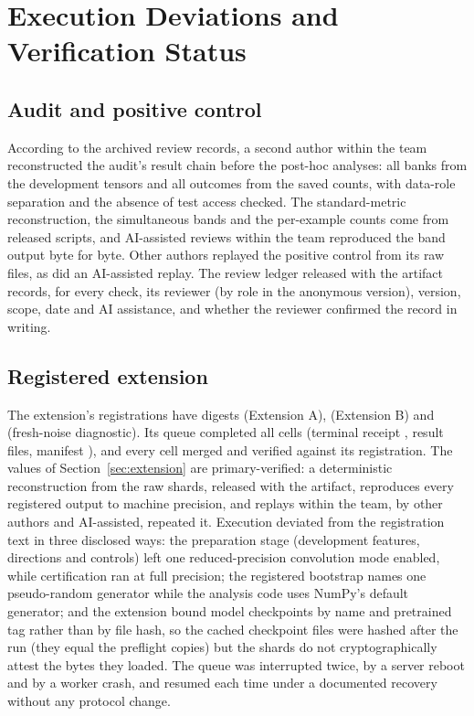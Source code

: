 
\section{Execution Deviations and Verification Status}
\label{app:deviations}

\subsection{Audit and positive control}

According to the archived review records, a second author within the team
reconstructed the audit's result chain before the post-hoc analyses: all
\ExpBanks{} banks from the development tensors and all \ExpRows{} outcomes from
the saved counts, with data-role separation and the absence of test access
checked. The standard-metric reconstruction, the simultaneous bands and the
per-example counts come from released scripts, and AI-assisted reviews within
the team reproduced the band output byte for byte. Other authors replayed the
positive control from its raw files, as did an AI-assisted replay. The review
ledger released with the artifact records, for every
check, its reviewer (by role in the anonymous version), version, scope, date
and AI assistance, and whether the reviewer confirmed the record in writing.

\subsection{Registered extension}

The extension's registrations have digests \ExtRegHashA{} (Extension A),
\ExtRegHashB{} (Extension B) and \ExtRegHashN{} (fresh-noise diagnostic). Its
queue completed all \ExtCellsMerged{} cells (terminal receipt
\ExtAReceiptStatus{}, \ExtResultFiles{} result files, manifest
\ExtResultManifest{}), and every cell merged and verified against its
registration. The values of Section~\ref{sec:extension} are primary-verified: a deterministic
reconstruction from the raw shards, released with the artifact, reproduces every
registered output to machine precision, and replays within the team, by other
authors and AI-assisted, repeated it. Execution deviated from the
registration text in three disclosed ways:
the preparation stage (development features, directions and controls) left one
reduced-precision convolution mode enabled, while certification ran at full
precision; the registered bootstrap names one pseudo-random
generator while the analysis code uses NumPy's default generator; and the
extension bound model checkpoints by name and pretrained tag rather than by file
hash, so the cached checkpoint files were hashed after the run (they equal the
preflight copies) but the shards do not cryptographically attest the bytes they
loaded. The queue was interrupted twice, by a server reboot and by a worker
crash, and resumed each time under a documented recovery without any protocol
change.

